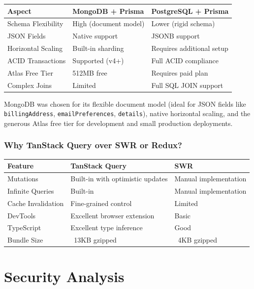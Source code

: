 \documentclass[12pt,a4paper]{report}
\begin{document}
\begin{center}
\begin{tabularx}{\textwidth}{lXX}
  \toprule
  \textbf{Aspect} & \textbf{MongoDB + Prisma} & \textbf{PostgreSQL + Prisma} \\
  \midrule
  Schema Flexibility & High (document model) & Lower (rigid schema) \\
  JSON Fields & Native support & JSONB support \\
  Horizontal Scaling & Built-in sharding & Requires additional setup \\
  ACID Transactions & Supported (v4+) & Full ACID compliance \\
  Atlas Free Tier & 512MB free & Requires paid plan \\
  Complex Joins & Limited & Full SQL JOIN support \\
  \bottomrule
\end{tabularx}
\end{center}

MongoDB was chosen for its flexible document model (ideal for JSON fields like \texttt{billingAddress}, \texttt{emailPreferences}, \texttt{details}), native horizontal scaling, and the generous Atlas free tier for development and small production deployments.

\subsection{Why TanStack Query over SWR or Redux?}

\begin{center}
\begin{tabularx}{\textwidth}{lXX}
  \toprule
  \textbf{Feature} & \textbf{TanStack Query} & \textbf{SWR} \\
  \midrule
  Mutations & Built-in with optimistic updates & Manual implementation \\
  Infinite Queries & Built-in & Manual implementation \\
  Cache Invalidation & Fine-grained control & Limited \\
  DevTools & Excellent browser extension & Basic \\
  TypeScript & Excellent type inference & Good \\
  Bundle Size & ~13KB gzipped & ~4KB gzipped \\
  \bottomrule
\end{tabularx}
\end{center}

\chapter{Security Analysis}
\end{document}
